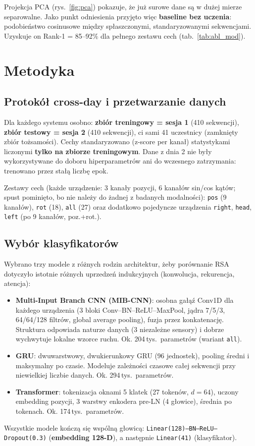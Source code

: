 \documentclass[11pt,a4paper]{article}
\begin{document}
Projekcja PCA (rys.~\ref{fig:pca}) pokazuje, że już surowe dane są w dużej mierze separowalne.
Jako punkt odniesienia przyjęto więc \textbf{baseline bez uczenia}: podobieństwo cosinusowe między spłaszczonymi,
standaryzowanymi sekwencjami. Uzyskuje on Rank-1 = 85--92\% dla pełnego zestawu cech (tab.~\ref{tab:abl_mod}).

\section{Metodyka}
\subsection{Protokół cross-day i przetwarzanie danych}
Dla każdego systemu osobno: \textbf{zbiór treningowy = sesja 1} (410 sekwencji), \textbf{zbiór testowy = sesja 2} (410 sekwencji),
ci sami 41 uczestnicy (zamknięty zbiór tożsamości). Cechy standaryzowano (z-score per kanał) statystykami
liczonymi \textbf{tylko na zbiorze treningowym}. Dane z dnia 2 nie były wykorzystywane do doboru hiperparametrów ani do
wczesnego zatrzymania: trenowano przez stałą liczbę epok.

Zestawy cech (każde urządzenie: 3 kanały pozycji, 6 kanałów sin/cos kątów; spust pominięto, bo nie należy do żadnej z badanych modalności):
\texttt{pos} (9 kanałów), \texttt{rot} (18), \texttt{all} (27) oraz dodatkowo pojedyncze urządzenia \texttt{right}, \texttt{head}, \texttt{left} (po 9 kanałów, poz.+rot.).

\subsection{Wybór klasyfikatorów}
Wybrano trzy modele z różnych rodzin architektur, żeby porównanie RSA dotyczyło istotnie różnych
uprzedzeń indukcyjnych (konwolucja, rekurencja, atencja):
\begin{itemize}
\item \textbf{Multi-Input Branch CNN (MIB-CNN)}: osobna gałąź Conv1D dla każdego urządzenia
  (3 bloki Conv--BN--ReLU--MaxPool, jądra 7/5/3, 64/64/128 filtrów, global average pooling), fuzja przez konkatenację.
  Struktura odpowiada naturze danych (3 niezależne sensory) i dobrze wychwytuje lokalne wzorce ruchu.
  Ok. 204\,tys.\ parametrów (wariant \texttt{all}).
\item \textbf{GRU}: dwuwarstwowy, dwukierunkowy GRU (96 jednostek), pooling średni i maksymalny po czasie.
  Modeluje zależności czasowe całej sekwencji przy niewielkiej liczbie danych. Ok. 294\,tys.\ parametrów.
\item \textbf{Transformer}: tokenizacja oknami 5 klatek (27 tokenów, $d=64$), uczony embedding pozycji,
  3 warstwy enkodera pre-LN (4 głowice), średnia po tokenach. Ok. 174\,tys.\ parametrów.
\end{itemize}
Wszystkie modele kończą się wspólną głowicą: \texttt{Linear(128)--BN--ReLU--Dropout(0.3)} (\textbf{embedding 128-D}),
a następnie \texttt{Linear(41)} (klasyfikator).
\end{document}
